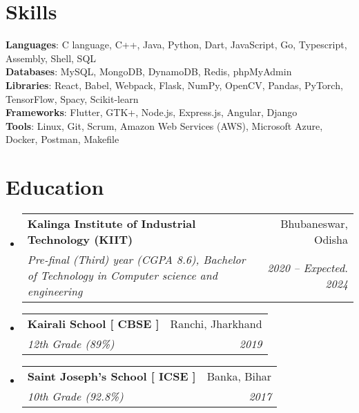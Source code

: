 \documentclass[letterpaper,11pt]{article}
\makeatletter
\newcommand{\resumeSubheading}[4]{
  \vspace{-2pt}\item
    \begin{tabular*}{0.97\textwidth}[t]{l@{\extracolsep{\fill}}r}
      \textbf{#1} & #2 \\
      \textit{\small#3} & \textit{\small #4} \\
    \end{tabular*}\vspace{-7pt}
}
\newcommand{\resumeSubHeadingListStart}{\begin{itemize}[leftmargin=0.15in, label={}]}
\newcommand{\resumeSubHeadingListEnd}{\end{itemize}}
\makeatother
\begin{document}
%
\section{Skills}
 \begin{itemize}[leftmargin=0.15in, label={}]
    \small{\item{
      \textbf{Languages}{: C language, C++, Java, Python, Dart, JavaScript, Go, Typescript, Assembly, Shell, SQL } \\
      \textbf{Databases}{: MySQL, MongoDB, DynamoDB, Redis, phpMyAdmin} \\
      \textbf{Libraries}{: React, Babel, Webpack, Flask, NumPy, OpenCV, Pandas, PyTorch, TensorFlow, Spacy, Scikit-learn} \\
     \textbf{Frameworks}{: Flutter, GTK+, Node.js, Express.js, Angular, Django } \\
     \textbf{Tools}{: Linux, Git, Scrum, Amazon Web Services (AWS), Microsoft Azure, Docker, Postman, Makefile } \\
    }}
 \end{itemize}
 
\section{Education}
  \resumeSubHeadingListStart
    \resumeSubheading
      {Kalinga Institute of Industrial Technology (KIIT)}{Bhubaneswar, Odisha}
      {Pre-final (Third) year (CGPA 8.6), Bachelor of Technology in Computer science and engineering}{2020 -- Expected. 2024}

    \resumeSubheading
      {Kairali School [ CBSE ]}{Ranchi, Jharkhand}
      {12th Grade (89\%)}{2019}

    \resumeSubheading
      {Saint Joseph's School [ ICSE ]}{Banka, Bihar}
      {10th Grade (92.8\%)}{2017}
  \resumeSubHeadingListEnd
\end{document}

